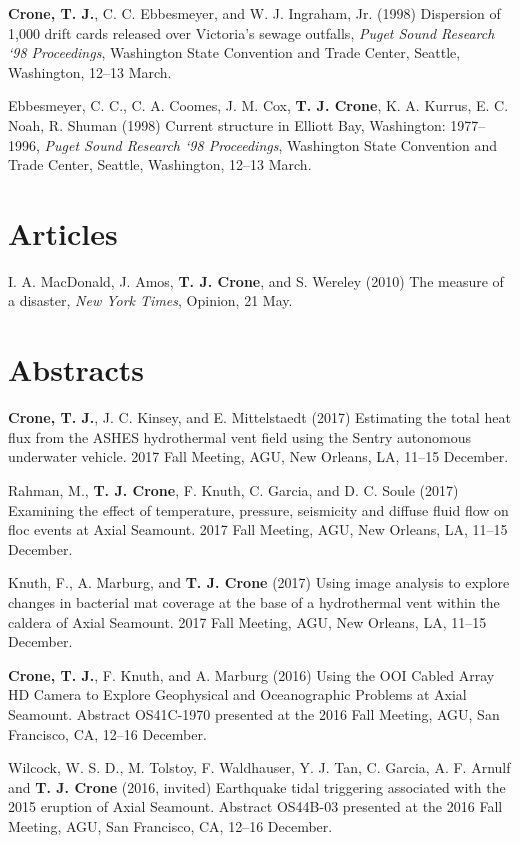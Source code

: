 \documentclass[11pt]{res}
\begin{document}
\begin{resume}
{\bf Crone, T. J.}, C. C. Ebbesmeyer,
and W. J. Ingraham, Jr. (1998) Dispersion of 1,000 drift cards released over Victoria's sewage outfalls, {\em Puget Sound Research `98 Proceedings}, Washington State Convention and Trade Center, Seattle, Washington, 12--13 March.

Ebbesmeyer, C. C., C. A. Coomes, J. M. Cox, {\bf T. J. Crone}, K. A. Kurrus, E. C. Noah, R. Shuman (1998) Current structure in Elliott Bay, Washington: 1977--1996, {\em Puget Sound Research `98 Proceedings}, Washington State Convention and Trade Center, Seattle, Washington, 12--13 March.

\section{\sc Articles} I. A. MacDonald, J. Amos, {\bf T. J. Crone}, and S. Wereley (2010) The measure of a disaster, {\em New York Times}, Opinion, 21 May.

\section{\sc Abstracts}

{\bf Crone, T. J.}, J. C. Kinsey, and E. Mittelstaedt (2017) Estimating the total heat flux from the ASHES hydrothermal vent field using the Sentry autonomous underwater vehicle. 2017 Fall Meeting, AGU, New Orleans, LA, 11--15 December.

Rahman, M., {\bf T. J. Crone}, F. Knuth, C. Garcia, and D. C. Soule (2017) Examining the effect of temperature, pressure, seismicity and diffuse fluid flow on floc events at Axial Seamount. 2017 Fall Meeting, AGU, New Orleans, LA, 11--15 December.

Knuth, F., A. Marburg, and {\bf T. J. Crone} (2017) Using image analysis to explore changes in bacterial mat coverage at the base of a hydrothermal vent within the caldera of Axial Seamount. 2017 Fall Meeting, AGU, New Orleans, LA, 11--15 December.

{\bf Crone, T. J.}, F. Knuth, and A. Marburg (2016) Using the OOI Cabled Array HD Camera to Explore Geophysical and Oceanographic Problems at Axial Seamount. Abstract OS41C-1970 presented at the 2016 Fall Meeting, AGU, San Francisco, CA, 12--16 December.

Wilcock, W. S. D., M. Tolstoy, F. Waldhauser, Y. J. Tan, C. Garcia, A. F. Arnulf and {\bf T. J. Crone} (2016, invited) Earthquake tidal triggering associated with the 2015 eruption of Axial Seamount. Abstract OS44B-03 presented at the 2016 Fall Meeting, AGU, San Francisco, CA, 12--16 December.


\end{resume}
\end{document}
